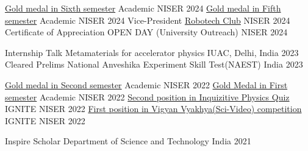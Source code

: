 


\begin{cvhonors}


	\cvhonor
	{\href{https://drive.google.com/file/d/1S9trZDG5RAgJ9uaTD9a5uKs0fd55oTmK/view?usp=drive_link}{Gold medal in Sixth semester}} %
	{Academic } %
	{NISER} %
	{2024} %
	\cvhonor
	{\href{https://drive.google.com/file/d/1SJ8k8_KBpfZY0qbG7-7fJTzis8N5fyPe/view?usp=drive_link}{Gold medal in Fifth semester}} %
	{Academic } %
	{NISER} %
	{2024} %
    \cvhonor
    {Vice-President} %
    {\href{https://www.niser.ac.in/~smishra/club/rtc/}{Robotech Club}} %
    {NISER} %
    {2024} %
    \cvhonor
    {Certificate of Appreciation} %
    {OPEN DAY (University Outreach)} %
    {NISER} %
    {2024} %
    
    \cvhonor
	{Internship Talk} %
	{Metamaterials for accelerator physics} %
	{IUAC, Delhi, India} %
	{2023} %
	\cvhonor
	{Cleared Prelims} %
	{National Anveshika Experiment Skill Test(NAEST)} %
	{India} %
	{2023} %
	
	\cvhonor
	{\href{https://drive.google.com/file/d/1SMKexb4U8J8IZ3u_zkZAnsvRiZugcJ00/view?usp=drive_link}{Gold medal in Second semester}} %
	{Academic } %
	{NISER} %
	{2022} %
	\cvhonor
	{\href{https://drive.google.com/file/d/1SSvkad1FpYYXrrszgXv9rvWw9z08BVhx/view?usp=drive_link}{Gold Medal in First semester}} %
	{Academic } %
	{NISER} %
	{2022} %
	\cvhonor
	{\href{https://drive.google.com/file/d/1S4NXbnCoEZ9ldu4KYN1qk7z6iz-5uD-d/view?usp=drive_link}{Second position in Inquizitive Physics Quiz}} %
	{IGNITE } %
	{NISER} %
	{2022} %
	\cvhonor
	{\href{https://drive.google.com/file/d/1S30TuAFoHa0YbhAHd_4MAFqFZT6GE8mc/view?usp=drive_link}{First position in Vigyan Vyakhya(Sci-Video) competition}} %
	{IGNITE } %
	{NISER} %
	{2022} %
	
  	\cvhonor
	{Inspire Scholar} %
	{Department of Science and Technology} %
	{India} %
	{2021} %


\end{cvhonors}